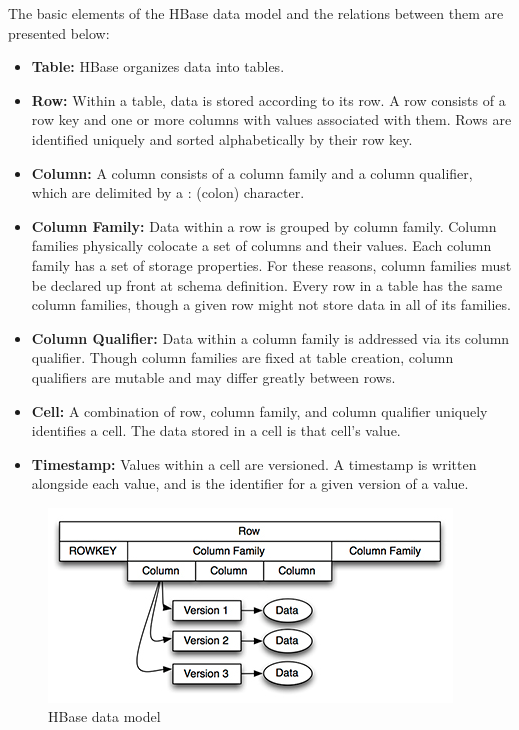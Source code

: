 The basic elements of the HBase data model and the relations between them are presented below:
\begin{itemize}
\item \textbf{Table:} HBase organizes data into tables.
\item \textbf{Row:} Within a table, data is stored according to its row. A row consists of a row key and one or more columns with values associated with them. Rows are identified uniquely and sorted alphabetically by their row key.
\item \textbf{Column:} A column consists of a column family and a column qualifier, which are delimited by a : (colon) character.
\item \textbf{Column Family:} Data within a row is grouped by column family. Column families physically colocate a set of columns and their values. Each column family has a set of storage properties. For these reasons, column families must be declared up front at schema definition. Every row in a table has the same column families, though a given row might not store data in all of its families.
\item \textbf{Column Qualifier:} Data within a column family is addressed via its column
qualifier. Though column families are fixed at table creation, column qualifiers are mutable and may differ greatly between rows.
\item \textbf{Cell:} A combination of row, column family, and column qualifier uniquely identifies a cell. The data stored in a cell is that cell's value.
\item \textbf{Timestamp:} Values within a cell are versioned. A timestamp is written alongside each value, and is the identifier for a given version of a value.
\end{itemize}

\begin{figure}[H]
\centering
\includegraphics{figures/hbase_data_model}
\caption{HBase data model}
\label{figure:hbase_data_model}
\end{figure}

